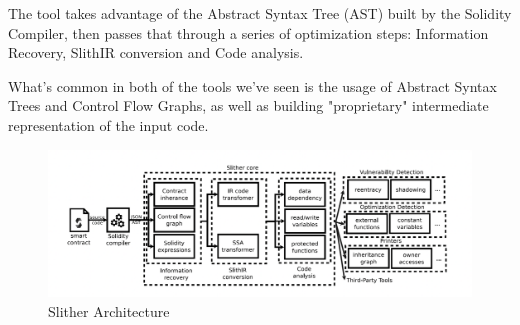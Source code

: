 The tool takes advantage of the Abstract Syntax Tree (AST) built by the Solidity Compiler, then passes that through a series of optimization steps: Information Recovery, SlithIR conversion and Code analysis.

What's common in both of the tools we've seen is the usage of Abstract Syntax Trees and Control Flow Graphs, as well as building "proprietary" intermediate representation of the input code.

\begin{figure}
    \centering
    \includegraphics[width=15cm]{images/slither_architecture.png}
    \caption{Slither Architecture}
    \label{fig:slither-architecture}
\end{figure}